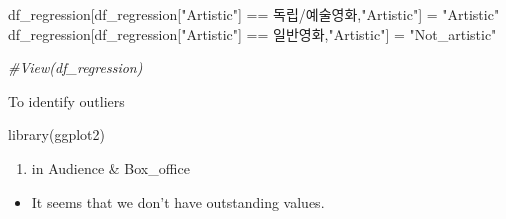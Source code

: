 \documentclass[
]{article}
\newenvironment{Shaded}{\begin{snugshade}}{\end{snugshade}}
\newcommand{\CommentTok}[1]{\textcolor[rgb]{0.56,0.35,0.01}{\textit{#1}}}
\newcommand{\FunctionTok}[1]{\textcolor[rgb]{0.00,0.00,0.00}{#1}}
\newcommand{\NormalTok}[1]{#1}
\newcommand{\OtherTok}[1]{\textcolor[rgb]{0.56,0.35,0.01}{#1}}
\newcommand{\SpecialCharTok}[1]{\textcolor[rgb]{0.00,0.00,0.00}{#1}}
\newcommand{\StringTok}[1]{\textcolor[rgb]{0.31,0.60,0.02}{#1}}
\providecommand{\tightlist}{%
  \setlength{\itemsep}{0pt}\setlength{\parskip}{0pt}}
\begin{document}
\begin{Shaded}
\begin{Highlighting}[]
\NormalTok{df\_regression[df\_regression[}\StringTok{"Artistic"}\NormalTok{] }\SpecialCharTok{==} \StringTok{\textquotesingle{}독립/예술영화\textquotesingle{}}\NormalTok{,}\StringTok{"Artistic"}\NormalTok{] }\OtherTok{=} \StringTok{"Artistic"}
\NormalTok{df\_regression[df\_regression[}\StringTok{"Artistic"}\NormalTok{] }\SpecialCharTok{==} \StringTok{\textquotesingle{}일반영화\textquotesingle{}}\NormalTok{,}\StringTok{"Artistic"}\NormalTok{] }\OtherTok{=} \StringTok{"Not\_artistic"}
\end{Highlighting}
\end{Shaded}

\begin{Shaded}
\end{Shaded}

\begin{Shaded}
\begin{Highlighting}[]
\CommentTok{\#View(df\_regression)}
\end{Highlighting}
\end{Shaded}

To identify outliers

\begin{Shaded}
\begin{Highlighting}[]
\FunctionTok{library}\NormalTok{(ggplot2)}
\end{Highlighting}
\end{Shaded}

\begin{enumerate}
\def\labelenumi{\arabic{enumi}.}
\tightlist
\item
  in Audience \& Box\_office
\end{enumerate}

\begin{itemize}
\tightlist
\item
  It seems that we don't have outstanding values.
\end{itemize}
\end{document}
